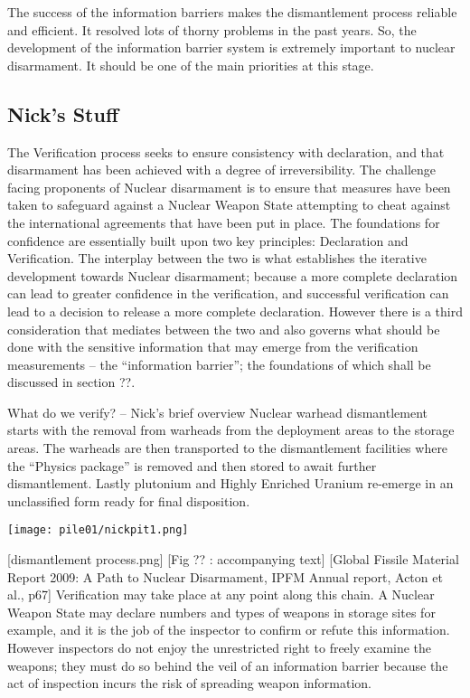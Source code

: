 \documentclass[twoside,titlepage,11pt,twocolumn,a4paper]{article}
\begin{document}
The success of the information barriers makes the dismantlement
process reliable and efficient. It resolved lots of thorny problems in
the past years. So, the development of the information barrier system
is extremely important to nuclear disarmament. It should be one of the
main priorities at this stage.

\subsection{Nick's Stuff}
The Verification process seeks to ensure consistency with declaration,
and that disarmament has been achieved with a degree of
irreversibility.  The challenge facing proponents of Nuclear
disarmament is to ensure that measures have been taken to safeguard
against a Nuclear Weapon State attempting to cheat against the
international agreements that have been put in place. The foundations
for confidence are essentially built upon two key principles:
Declaration and Verification. The interplay between the two is what
establishes the iterative development towards Nuclear disarmament;
because a more complete declaration can lead to greater confidence in
the verification, and successful verification can lead to a decision
to release a more complete declaration. However there is a third
consideration that mediates between the two and also governs what
should be done with the sensitive information that may emerge from the
verification measurements -- the ``information barrier''; the
foundations of which shall be discussed in section ??.

What do we verify? -- Nick’s brief overview Nuclear warhead
dismantlement starts with the removal from warheads from the
deployment areas to the storage areas. The warheads are then
transported to the dismantlement facilities where the ``Physics
package'' is removed and then stored to await further
dismantlement. Lastly plutonium and Highly Enriched Uranium re-emerge
in an unclassified form ready for final disposition.

\begin{figure*}
  \texttt{[image: pile01/nickpit1.png]}
\end{figure*}

[dismantlement process.png] [Fig ?? : accompanying text] [Global
  Fissile Material Report 2009: A Path to Nuclear Disarmament, IPFM
  Annual report, Acton et al., p67] Verification may take place at any
point along this chain. A Nuclear Weapon State may declare numbers and
types of weapons in storage sites for example, and it is the job of
the inspector to confirm or refute this information.  However
inspectors do not enjoy the unrestricted right to freely examine the
weapons; they must do so behind the veil of an information barrier
because the act of inspection incurs the risk of spreading weapon
information.
\end{document}
